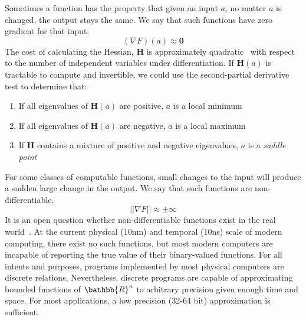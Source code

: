 \documentclass[12pt,initial,twoside,maitrise]{dms}
\numberwithin{equation}{section}
\numberwithin{table}{chapter}
\numberwithin{figure}{chapter}
\begin{document}
\noindent Sometimes a function has the property that given an input $a$, no matter $a$ is changed, the output stays the same. We say that such functions have zero gradient for that input.
%
\begin{equation}
    (\nabla F)(a) \approx \mathbf{0}
\end{equation}
%
The cost of calculating the Hessian, $\mathbf{H}$ is approximately quadratic~\cite{griewank1993some} with respect to the number of independent variables under differentiation. If $\mathbf{H}(a)$ is tractable to compute and invertible, we could use the second-partial derivative test to determine that:\\
%
\begin{enumerate}
    \item If all eigenvalues of $\mathbf{H}(a)$ are positive, $a$ is a local minimum
    \item If all eigenvalues of $\mathbf{H}(a)$ are negative, $a$ is a local maximum
    \item If $\mathbf{H}$ contains a mixture of positive and negative eigenvalues, $a$ is a \textit{saddle point}\\
\end{enumerate}
%
For some classes of computable functions, small changes to the input will produce a sudden large change in the output. We say that such functions are non-differentiable.
%
\begin{equation}
    ||\nabla F|| \approx \pm \infty
\end{equation}
%
It is an open question whether non-differentiable functions exist in the real world~\cite{buniy2005hilbert}. At the current physical (10nm) and temporal (10ns) scale of modern computing, there exist no such functions, but most modern computers are incapable of reporting the true value of their binary-valued functions. For all intents and purposes, programs implemented by most physical computers are discrete relations. Nevertheless, discrete programs are capable of approximating bounded functions of $\bathbb{R}^n$ to arbitrary precision given enough time and space. For most applications, a low precision (32-64 bit) approximation is sufficient.
\end{document}
